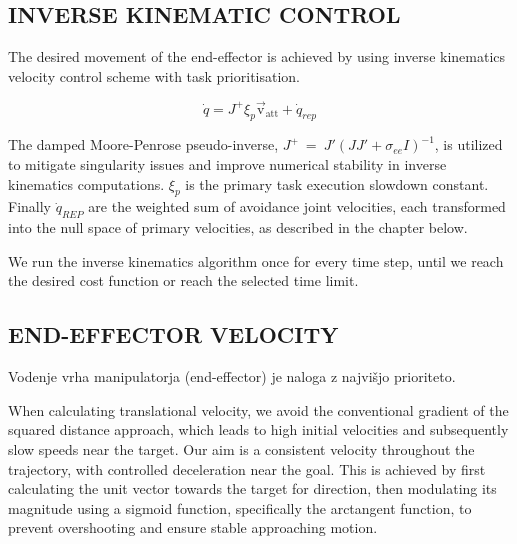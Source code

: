 \documentclass[letterpaper, 10 pt, conference]{ieeeconf}  %
\begin{document}
\subsection{INVERSE KINEMATIC CONTROL}

The desired movement of the end-effector is achieved by using inverse kinematics velocity control scheme with task prioritisation. 

\begin{equation}
	\dot{q} = J^+ \xi_{p} \mathrm{\vec{v}_{att}} + \dot{q}_{rep}
\end{equation}

The damped Moore-Penrose pseudo-inverse, \(J^+~=~J'(JJ' + \sigma_{ee} I)^{-1}\), is utilized to mitigate singularity issues and improve numerical stability in inverse kinematics computations. $\xi_{p}$ is the primary task execution slowdown constant. Finally $\dot{q}_{REP}$ are the weighted sum of avoidance joint velocities, each transformed into the null space of primary velocities, as described in the chapter below. 


We run the inverse kinematics algorithm once for every time step, until we reach the desired cost function or reach the selected time limit. 

\subsection{END-EFFECTOR VELOCITY}

Vodenje vrha manipulatorja (end-effector) je naloga z najvišjo prioriteto. 


When calculating translational velocity, we avoid the conventional gradient of the squared distance approach, which leads to high initial velocities and subsequently slow speeds near the target. Our aim is a consistent velocity throughout the trajectory, with controlled deceleration near the goal. This is achieved by first calculating the unit vector towards the target for direction, then modulating its magnitude using a sigmoid function, specifically the arctangent function, to prevent overshooting and ensure stable approaching motion.
\end{document}
